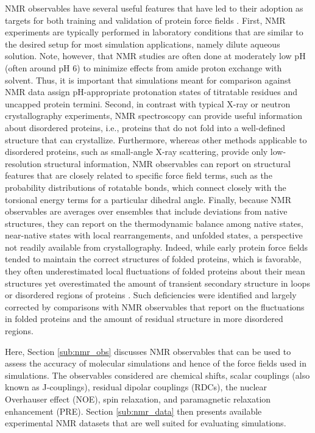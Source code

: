 \documentclass[9pt,review,pubversion]{livecoms}
\begin{document}
NMR observables have several useful features that have led to their adoption as targets for both training and validation of protein force fields \cite{allison_assessing_2012}.
First, NMR experiments are typically performed in laboratory conditions that are similar to the desired setup for most simulation applications, namely dilute aqueous solution.
Note, however, that NMR studies are often done at moderately low pH (often around pH 6) to minimize effects from amide proton exchange with solvent.
Thus, it is important that simulations meant for comparison against NMR data assign pH-appropriate protonation states of titratable residues and uncapped protein termini.
Second, in contrast with typical X-ray or neutron crystallography experiments, NMR spectroscopy can provide useful information about disordered proteins, i.e., proteins that do not fold into a well-defined structure that can crystallize.
Furthermore, whereas other methods applicable to disordered proteins, such as small-angle X-ray scattering, provide only low-resolution structural information, NMR observables can report on structural features that are closely related to specific force field terms, such as the probability distributions of rotatable bonds, which connect closely with the torsional energy terms for a particular dihedral angle.
Finally, because NMR observables are averages over ensembles that include deviations from native structures, they can report on the thermodynamic balance among native states, near-native states with local rearrangements, and unfolded states, a perspective not readily available from crystallography.
Indeed, while early protein force fields tended to maintain the correct structures of folded proteins, which is favorable, they often underestimated local fluctuations of folded proteins about their mean structures yet overestimated the amount of transient secondary structure in loops or disordered regions of proteins \cite{mackerell_jr_extending_2004,Hornak:2006:Proteins,lindorff-larsen_improved_2010,best_optimization_2012,Maier:2015:J.Chem.TheoryComput.,diem_hamiltonian_2020}.
Such deficiencies were identified and largely corrected by comparisons with NMR observables that report on the fluctuations in folded proteins and the amount of residual structure in more disordered regions.

Here, Section \ref{sub:nmr_obs} discusses NMR observables that can be used to assess the accuracy of molecular simulations and hence of the force fields used in simulations.
The observables considered are chemical shifts, scalar couplings (also known as J-couplings), residual dipolar couplings (RDCs), the nuclear Overhauser effect (NOE), spin relaxation, and paramagnetic relaxation enhancement (PRE).
Section \ref{sub:nmr_data} then presents available experimental NMR datasets that are well suited for evaluating simulations.
\end{document}
